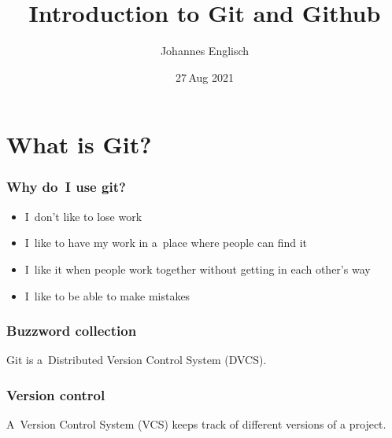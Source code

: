 \documentclass[12pt]{beamer}
\title{Introduction to Git and Github}
\author{Johannes Englisch}
\date{27\,Aug 2021}
\begin{document}
{%
  \begin{frame}
    \titlepage%
  \end{frame}%
}

\section{What is Git?}

\begin{frame}
  \frametitle{Why do~I use git?}

  \begin{itemize}
    \item I~don't like to lose work
    \item I~like to have my work in a~place where people can find it
    \item I~like it when people work together without getting in each other's
      way
    \item I~like to be able to make mistakes
  \end{itemize}
\end{frame}

\begin{frame}
  \frametitle{Buzzword collection}

  Git is a~\alert{Distributed Version Control System} (DVCS).
\end{frame}

\begin{frame}
  \frametitle{Version control}

  A~\alert{Version Control System} (VCS) keeps track of different versions of
  a project.
\end{frame}
\end{document}
